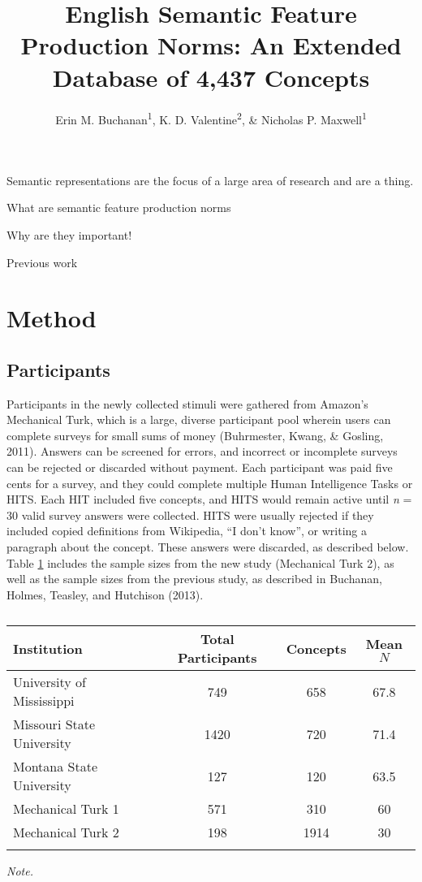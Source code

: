 \documentclass[english,man]{apa6}
\title{English Semantic Feature Production Norms: An Extended Database of 4,437
Concepts}
\author{Erin M. Buchanan\textsuperscript{1}, K. D. Valentine\textsuperscript{2}, \& Nicholas P. Maxwell\textsuperscript{1}}
\affiliation{
    \vspace{0.5cm}
          \textsuperscript{1} Missouri State University\\
          \textsuperscript{2} University of Missouri  }
\theoremstyle{definition}
\theoremstyle{definition}
\theoremstyle{definition}
\theoremstyle{remark}
\begin{document}
\maketitle

\setcounter{secnumdepth}{0}



Semantic representations are the focus of a large area of research and
are a thing.

What are semantic feature production norms

Why are they important!

Previous work

\section{Method}\label{method}

\subsection{Participants}\label{participants}

Participants in the newly collected stimuli were gathered from Amazon's
Mechanical Turk, which is a large, diverse participant pool wherein
users can complete surveys for small sums of money (Buhrmester, Kwang,
\& Gosling, 2011). Answers can be screened for errors, and incorrect or
incomplete surveys can be rejected or discarded without payment. Each
participant was paid five cents for a survey, and they could complete
multiple Human Intelligence Tasks or HITS. Each HIT included five
concepts, and HITS would remain active until \emph{n} = 30 valid survey
answers were collected. HITS were usually rejected if they included
copied definitions from Wikipedia, \enquote{I don't know}, or writing a
paragraph about the concept. These answers were discarded, as described
below. Table \ref{tab:part-table} includes the sample sizes from the new
study (Mechanical Turk 2), as well as the sample sizes from the previous
study, as described in Buchanan, Holmes, Teasley, and Hutchison (2013).

\begin{table}[tbp]
\begin{center}
\begin{threeparttable}
\caption{\label{tab:part-table}}
\begin{tabular}{lccc}
\toprule
Institution & Total Participants & Concepts & Mean $N$\\
\midrule
University of Mississippi & 749 & 658 & 67.8\\
Missouri State University & 1420 & 720 & 71.4\\
Montana State University & 127 & 120 & 63.5\\
Mechanical Turk 1 & 571 & 310 & 60\\
Mechanical Turk 2 & 198 & 1914 & 30\\
\bottomrule
\addlinespace
\end{tabular}
\begin{tablenotes}[para]
\textit{Note.} 
\end{tablenotes}
\end{threeparttable}
\end{center}
\end{table}
\end{document}
